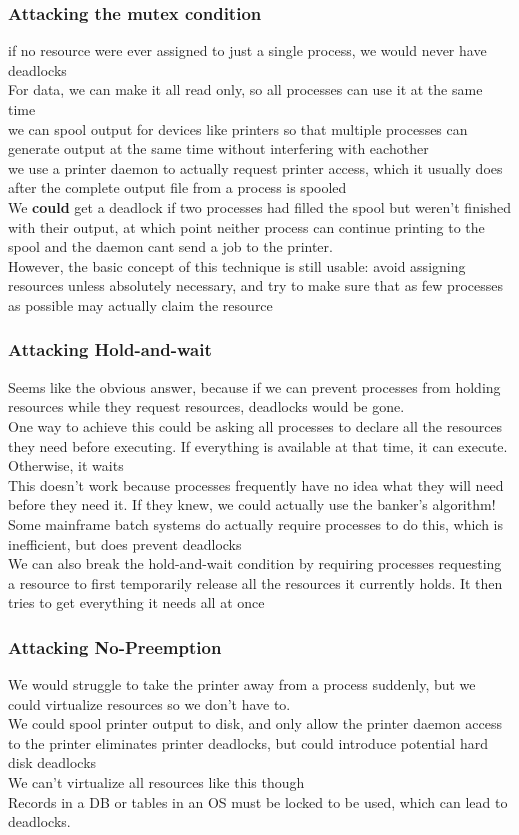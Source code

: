 \documentclass{article}
\begin{document}
\subsubsection*{Attacking the mutex condition}
if no resource were ever assigned to just a single process, we would never have deadlocks
\\For data, we can make it all read only, so all processes can use it at the same time
\\we can spool output for devices like printers so that multiple processes can generate output at the same time without interfering with eachother
\\we use a printer daemon to actually request printer access, which it usually does after the complete output file from a process is spooled
\\We \textbf{could} get a deadlock if two processes had filled the spool but weren't finished with their output, at which point neither process can continue printing to the spool and the daemon cant send a job to the printer.
\\However, the basic concept of this technique is still usable: avoid assigning resources unless absolutely necessary, and try to make sure that as few processes as possible may actually claim the resource
\subsubsection*{Attacking Hold-and-wait}
Seems like the obvious answer, because if we can prevent processes from holding resources while they request resources, deadlocks would be gone.
\\One way to achieve this could be asking all processes to declare all the resources they need before executing. If everything is available at that time, it can execute. Otherwise, it waits
\\This doesn't work because processes frequently have no idea what they will need before they need it. If they knew, we could actually use the banker's algorithm!
\\Some mainframe batch systems do actually require processes to do this, which is inefficient, but does prevent deadlocks
\\We can also break the hold-and-wait condition by requiring processes requesting a resource to first temporarily release all the resources it currently holds. It then tries to get everything it needs all at once
\subsubsection*{Attacking No-Preemption}
We would struggle to take the printer away from a process suddenly, but we could virtualize resources so we don't have to.
\\We could spool printer output to disk, and only allow the printer daemon access to the printer eliminates printer deadlocks, but could introduce potential hard disk deadlocks
\\We can't virtualize all resources like this though
\\Records in a DB or tables in an OS must be locked to be used, which can lead to deadlocks.
\end{document}
